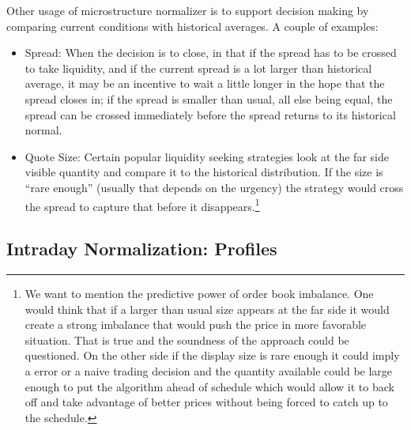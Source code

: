 Other usage of microstructure normalizer is to support decision making by comparing current conditions with historical averages. A couple of examples:
        \begin{itemize}
        \item Spread: When the decision is to close, in that if the spread has to be crossed to take liquidity, and if the current spread is a lot larger than historical average, it may be an incentive to wait a little longer in the hope that the spread closes in; if the spread is smaller than usual, all else being equal, the spread can be crossed immediately before the spread returns to its historical normal.
        \item Quote Size: Certain popular liquidity seeking strategies look at the far side visible quantity and compare it to the historical distribution. If the size is ``rare enough'' (usually that depends on the urgency) the strategy would  cross the spread to capture that before it disappears.\footnote{We want to mention the predictive power of order book imbalance. One would think that if a larger than usual size appears at the far side it would create a strong imbalance that would push the price in more favorable situation. That is true and the soundness of the approach could be questioned. On the other side if the display size is rare enough it could imply a error or a naive trading decision and the quantity available could be large enough to put the algorithm ahead of schedule which would allow it to back off and take advantage of better prices without being forced to catch up to the schedule.}
        \end{itemize}



\subsection{Intraday Normalization: Profiles\label{s:profiles}}

